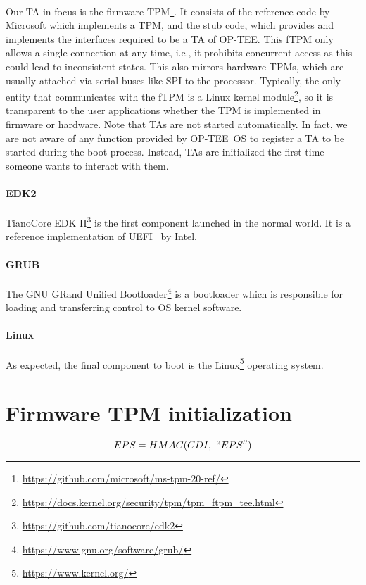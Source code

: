 Our TA in focus is the firmware TPM\footnote{\url{https://github.com/microsoft/ms-tpm-20-ref/}}\@.
It consists of the reference code by Microsoft which implements a TPM, and the stub code, which provides and implements the interfaces required to be a TA of OP-TEE\@.
This fTPM only allows a single connection at any time, i.e., it prohibits concurrent access as this could lead to inconsistent states.
This also mirrors hardware TPMs, which are usually attached via serial buses like SPI to the processor.
Typically, the only entity that communicates with the fTPM is a Linux kernel module\footnote{\url{https://docs.kernel.org/security/tpm/tpm_ftpm_tee.html}}, so it is transparent to the user applications whether the TPM is implemented in firmware or hardware.
Note that TAs are not started automatically.
In fact, we are not aware of any function provided by OP-TEE~OS to register a TA to be started during the boot process. 
Instead, TAs are initialized the first time someone wants to interact with them.

\paragraph{EDK2}
TianoCore EDK II\footnote{\url{https://github.com/tianocore/edk2}} is the first component launched in the normal world.
It is a reference implementation of UEFI~\cite{UEFI} by Intel.

\paragraph{GRUB}
The GNU GRand Unified Bootloader\footnote{\url{https://www.gnu.org/software/grub/}} is a bootloader which is responsible for loading and transferring control to OS kernel software.

\paragraph{Linux}
As expected, the final component to boot is the Linux\footnote{\url{https://www.kernel.org/}} operating system.

\section{Firmware TPM initialization}

\begin{equation}
  EPS = HMAC(CDI,\ ``EPS'')
\end{equation}

